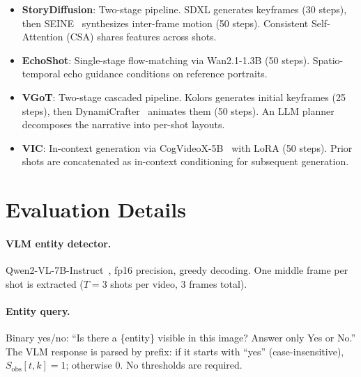 \documentclass[sigconf,review,anonymous]{acmart}
\begin{document}
\begin{itemize}[leftmargin=*,nosep]
  \item \textbf{StoryDiffusion}: Two-stage pipeline. SDXL generates keyframes (30 steps), then SEINE~\cite{seine} synthesizes inter-frame motion (50 steps). Consistent Self-Attention (CSA) shares features across shots.
  \item \textbf{EchoShot}: Single-stage flow-matching via Wan2.1-1.3B (50 steps). Spatio-temporal echo guidance conditions on reference portraits.
  \item \textbf{VGoT}: Two-stage cascaded pipeline. Kolors generates initial keyframes (25 steps), then DynamiCrafter~\cite{dynamicrafter} animates them (50 steps). An LLM planner decomposes the narrative into per-shot layouts.
  \item \textbf{VIC}: In-context generation via CogVideoX-5B~\cite{cogvideox} with LoRA (50 steps). Prior shots are concatenated as in-context conditioning for subsequent generation.
\end{itemize}


\section{Evaluation Details}
\label{app:eval_details}

\paragraph{VLM entity detector.}
Qwen2-VL-7B-Instruct~\cite{qwen2vl}, fp16 precision, greedy decoding.
One middle frame per shot is extracted ($T = 3$ shots per video, 3 frames total).

\paragraph{Entity query.}
Binary yes/no: ``Is there a \{entity\} visible in this image? Answer only Yes or No.'' The VLM response is parsed by prefix: if it starts with ``yes'' (case-insensitive), $S_\text{obs}[t,k] = 1$; otherwise 0. No thresholds are required.
\end{document}
